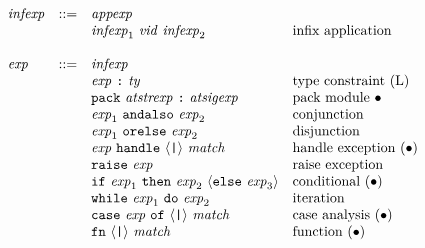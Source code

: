 \documentclass[twoside,titlepage]{article}
\begin{document}
\begin{appendix}
$$\begin{array}{llll}
  \\
  \mathit{infexp} & ::= & \mathit{appexp} \\
  && \mathit{infexp}_1~\mathit{vid}~\mathit{infexp}_2 & \textrm{infix application} \\
  \\
  \mathit{exp} & ::= & \mathit{infexp} \\
  && \mathit{exp}~\mbox{\tt:}~\mathit{ty} & \textrm{type constraint (L)} \\
  && {\tt{pack}}~\mathit{atstrexp}~\mbox{\tt:}~\mathit{atsigexp} & \textrm{pack module $\bullet$} \\
  && \mathit{exp}_1~{\tt{andalso}}~\mathit{exp}_2 & \textrm{conjunction} \\
  && \mathit{exp}_1~{\tt{orelse}}~\mathit{exp}_2 & \textrm{disjunction} \\
  && \mathit{exp}~{\tt{handle}}~\langle\mbox{\tt|}\rangle~\mathit{match} & \textrm{handle exception $(\bullet)$} \\
  && {\tt{raise}}~\mathit{exp} & \textrm{raise exception} \\
  && {\tt{if}}~\mathit{exp}_1 ~{\tt{then}}~\mathit{exp}_2~\langle{\tt{else}}~\mathit{exp}_3\rangle & \textrm{conditional $(\bullet)$} \\
  && {\tt{while}}~\mathit{exp}_1 ~{\tt{do}}~\mathit{exp}_2 & \textrm{iteration} \\
  && {\tt{case}}~\mathit{exp} ~{\tt{of}}~\langle\mbox{\tt|}\rangle~\mathit{match} & \textrm{case analysis $(\bullet)$} \\
  && {\tt{fn}}~\langle\mbox{\tt|}\rangle~\mathit{match} & \textrm{function $(\bullet)$}
  \end{array}
  $$

\clearpage


\end{appendix}
\end{document}
